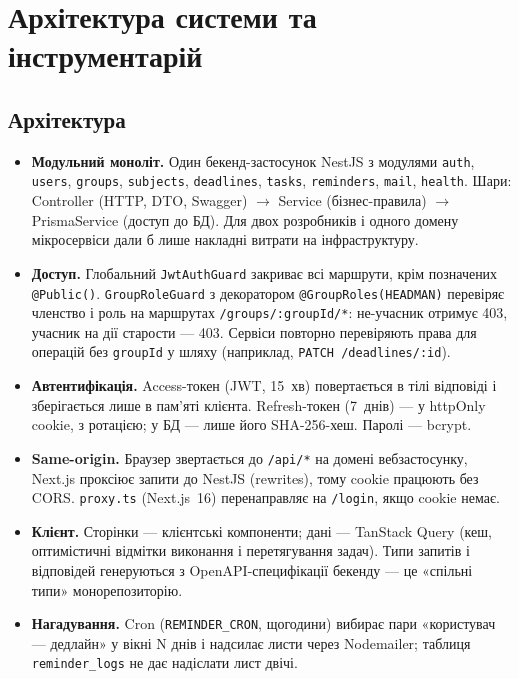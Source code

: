 \documentclass[12pt]{article}
\begin{document}
\section{Архітектура системи та інструментарій}
\subsection{Архітектура}
\begin{itemize}[leftmargin=1.2em,itemsep=2pt]
  \item \textbf{Модульний моноліт.} Один бекенд-застосунок NestJS з модулями \texttt{auth}, \texttt{users}, \texttt{groups}, \texttt{subjects}, \texttt{deadlines}, \texttt{tasks}, \texttt{reminders}, \texttt{mail}, \texttt{health}. Шари: Controller (HTTP, DTO, Swagger) $\to$ Service (бізнес-правила) $\to$ PrismaService (доступ до БД). Для двох розробників і одного домену мікросервіси дали б лише накладні витрати на інфраструктуру.
  \item \textbf{Доступ.} Глобальний \texttt{JwtAuthGuard} закриває всі маршрути, крім позначених \texttt{@Public()}. \texttt{GroupRoleGuard} з декоратором \texttt{@GroupRoles(HEADMAN)} перевіряє членство і роль на маршрутах \texttt{/groups/:groupId/*}: не-учасник отримує 403, учасник на дії старости --- 403. Сервіси повторно перевіряють права для операцій без \texttt{groupId} у шляху (наприклад, \texttt{PATCH /deadlines/:id}).
  \item \textbf{Автентифікація.} Access-токен (JWT, 15~хв) повертається в тілі відповіді і зберігається лише в пам'яті клієнта. Refresh-токен (7~днів) --- у httpOnly cookie, з ротацією; у БД --- лише його SHA-256-хеш. Паролі --- bcrypt.
  \item \textbf{Same-origin.} Браузер звертається до \texttt{/api/*} на домені вебзастосунку, Next.js проксіює запити до NestJS (rewrites), тому cookie працюють без CORS. \texttt{proxy.ts} (Next.js~16) перенаправляє на \texttt{/login}, якщо cookie немає.
  \item \textbf{Клієнт.} Сторінки --- клієнтські компоненти; дані --- TanStack Query (кеш, оптимістичні відмітки виконання і перетягування задач). Типи запитів і відповідей генеруються з OpenAPI-специфікації бекенду --- це «спільні типи» монорепозиторію.
  \item \textbf{Нагадування.} Cron (\texttt{REMINDER\_CRON}, щогодини) вибирає пари «користувач --- дедлайн» у вікні N днів і надсилає листи через Nodemailer; таблиця \texttt{reminder\_logs} не дає надіслати лист двічі.
\end{itemize}
\end{document}
